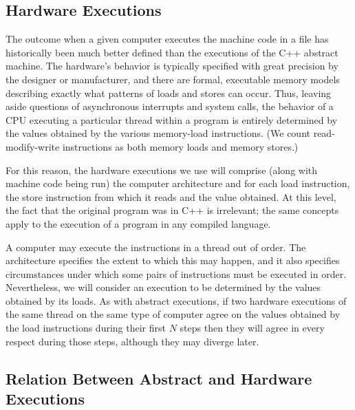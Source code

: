 \documentclass[10]{article}
\begin{document}
\subsection{Hardware Executions}
\label{sec:Hardware Executions}

The outcome when a given computer executes the machine code in a file
has historically been much better defined than the executions of the
C++ abstract machine.
The hardware's behavior is typically specified with great precision by
the designer or manufacturer, and there are formal, executable memory models
describing exactly what patterns of loads and stores can occur.
Thus, leaving aside questions of asynchronous interrupts and system
calls, the behavior of a CPU executing a particular thread within a
program is entirely determined by the values obtained by the various
memory-load instructions.
(We count read-modify-write instructions as both memory loads and
memory stores.)

For this reason, the hardware executions we use will comprise (along
with machine code being run) the computer architecture and for each
load instruction, the store instruction from which it reads and the
value obtained.
At this level, the fact that the original program was in C++ is
irrelevant; the same concepts apply to the execution of a program in
any compiled language.

A computer may execute the instructions in a thread out of order.
The architecture specifies the extent to which this may happen, and it
also specifies circumstances under which some pairs of instructions
must be executed in order.
Nevertheless, we will consider an execution to be determined by the
values obtained by its loads.
As with abstract executions, if two hardware executions of the same
thread on the same type of computer agree on the values obtained by
the load instructions during their first $N$ steps then they will
agree in every respect during those steps, although they may diverge
later.

\subsection{Relation Between Abstract and Hardware Executions}
\label{sec:Relation Between Abstract and Hardware Executions}
\end{document}
